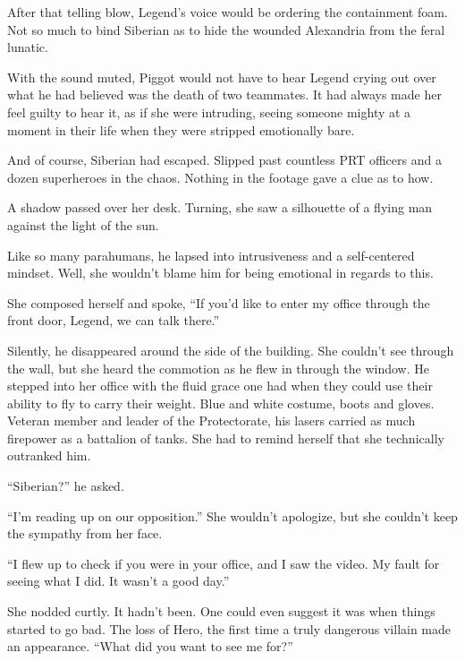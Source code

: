 After that telling blow, Legend's voice would be ordering the containment foam.  Not so much to bind Siberian as to hide the wounded Alexandria from the feral lunatic.



With the sound muted, Piggot would not have to hear Legend crying out over what he had believed was the death of two teammates.  It had always made her feel guilty to hear it, as if she were intruding, seeing someone mighty at a moment in their life when they were stripped emotionally bare.



And of course, Siberian had escaped.  Slipped past countless PRT officers and a dozen superheroes in the chaos.  Nothing in the footage gave a clue as to how.



A shadow passed over her desk.  Turning, she saw a silhouette of a flying man against the light of the sun.



Like so many parahumans, he lapsed into intrusiveness and a self-centered mindset.  Well, she wouldn't blame him for being emotional in regards to this.



She composed herself and spoke, ``If you'd like to enter my office through the front door, Legend, we can talk there.''



Silently, he disappeared around the side of the building.  She couldn't see through the wall, but she heard the commotion as he flew in through the window.  He stepped into her office with the fluid grace one had when they could use their ability to fly to carry their weight.  Blue and white costume, boots and gloves.  Veteran member and leader of the Protectorate, his lasers carried as much firepower as a battalion of tanks.  She had to remind herself that she technically outranked him.



``Siberian?'' he asked.



``I'm reading up on our opposition.''  She wouldn't apologize, but she couldn't keep the sympathy from her face.



``I flew up to check if you were in your office, and I saw the video.  My fault for seeing what I did.  It wasn't a good day.''



She nodded curtly.  It hadn't been.  One could even suggest it was when things started to go bad.  The loss of Hero, the first time a truly dangerous villain made an appearance.  ``What did you want to see me for?''



